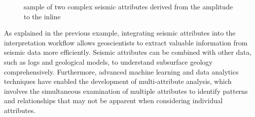 \begin{figure}[htb!]
    \captionsetup[subfigure]{justification=centering}
    \centering

    

    \caption{sample of two complex seismic attributes derived from the amplitude to the inline}
    \label{fig:seismic-complex-attr}
\end{figure}

As explained in the previous example, integrating seismic attributes into the interpretation workflow allows geoscientists to extract valuable information from seismic data more efficiently.
Seismic attributes can be combined with other data, such as logs and geological models, to understand subsurface geology comprehensively.
Furthermore, advanced machine learning and data analytics techniques have enabled the development of multi-attribute analysis, which involves the simultaneous examination of multiple attributes to identify patterns and relationships that may not be apparent when considering individual attributes.

